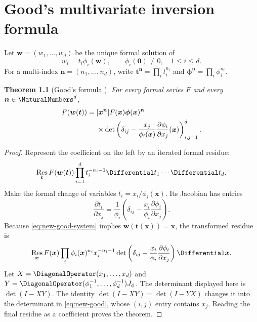\documentclass[11pt,a4paper,oneside,openany]{book}
\newtheorem{theorem}{Theorem}[chapter]
\theoremstyle{definition}
\theoremstyle{remark}
\begin{document}
\chapter{Good's multivariate inversion formula}
\label{ch:good-inversion}

Let $\boldsymbol w=(w_1,\ldots,w_d)$ be the unique formal solution of
\begin{equation}\label{eq:new-good-system}
 w_i=t_i\phi_i(\boldsymbol w),\qquad \phi_i(\boldsymbol0)\ne0,
 \quad 1\le i\le d.
\end{equation}
For a multi-index $\boldsymbol n=(n_1,\ldots,n_d)$, write
$\boldsymbol t^{\boldsymbol n}=\prod_i t_i^{n_i}$ and
$\boldsymbol\phi^{\boldsymbol n}=\prod_i\phi_i^{n_i}$.

\begin{theorem}[Good's formula \cite{Good1960}]\label{thm:new-good}
For every formal series $F$ and every
$\boldsymbol n\in\NaturalNumbers^d$,
\begin{align}
 [\boldsymbol t^{\boldsymbol n}]F(\boldsymbol w(\boldsymbol t))
={}&[\boldsymbol x^{\boldsymbol n}]
 F(\boldsymbol x)\boldsymbol\phi(\boldsymbol x)^{\boldsymbol n}
 \notag\\
 &\times\det\left(
 \delta_{ij}-\frac{x_j}{\phi_i(\boldsymbol x)}
 \frac{\partial\phi_i}{\partial x_j}(\boldsymbol x)
 \right)_{i,j=1}^{d}.
 \label{eq:new-good}
\end{align}
\end{theorem}

\begin{proof}
Represent the coefficient on the left by an iterated formal residue:
\[
 \operatorname*{Res}_{\boldsymbol t}
 F(\boldsymbol w(\boldsymbol t))
 \prod_{i=1}^dt_i^{-n_i-1}\Differential t_1\cdots\Differential t_d.
\]
Make the formal change of variables
$t_i=x_i/\phi_i(\boldsymbol x)$.  Its Jacobian has entries
\[
 \frac{\partial t_i}{\partial x_j}
 =\frac1{\phi_i}
 \left(\delta_{ij}-\frac{x_i}{\phi_i}
 \frac{\partial\phi_i}{\partial x_j}\right).
\]
Because \eqref{eq:new-good-system} implies
$\boldsymbol w(\boldsymbol t(\boldsymbol x))=\boldsymbol x$, the transformed
residue is
\begin{align*}
 \operatorname*{Res}_{\boldsymbol x}
 F(\boldsymbol x)
 \prod_i\phi_i(\boldsymbol x)^{n_i}x_i^{-n_i-1}
 \det\left(
 \delta_{ij}-\frac{x_i}{\phi_i}
 \frac{\partial\phi_i}{\partial x_j}
 \right)\Differential\boldsymbol x.
\end{align*}
Let $X=\DiagonalOperator(x_1,\ldots,x_d)$ and
$Y=\DiagonalOperator(\phi_1^{-1},\ldots,\phi_d^{-1})J_\phi$.
The determinant displayed here is $\det(I-XY)$.  The identity
$\det(I-XY)=\det(I-YX)$ changes it into the determinant in
\eqref{eq:new-good}, whose $(i,j)$ entry contains $x_j$.  Reading the final
residue as a coefficient proves the theorem.
\end{proof}
\end{document}
